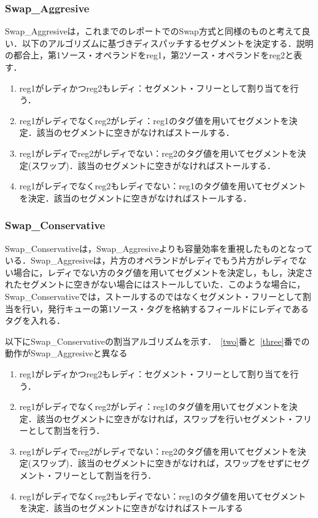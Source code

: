 \documentclass[twocolumn]{jsarticle}
\begin{document}
  \subsubsection{Swap\_Aggresive}
  Swap\_Aggresiveは，これまでのレポートでのSwap方式と同様のものと考えて良い．以下のアルゴリズムに基づきディスパッチするセグメントを決定する．説明の都合上，第1ソース・オペランドをreg1，第2ソース・オペランドをreg2と表す．
  \begin{enumerate}
    \item reg1がレディかつreg2もレディ：セグメント・フリーとして割り当てを行う．
    \label{one}
    \item reg1がレディでなくreg2がレディ：reg1のタグ値を用いてセグメントを決定．該当のセグメントに空きがなければストールする．
    \label{two}
    \item reg1がレディでreg2がレディでない：reg2のタグ値を用いてセグメントを決定(スワップ)．該当のセグメントに空きがなければストールする．
    \label{three}
    \item reg1がレディでなくreg2もレディでない：reg1のタグ値を用いてセグメントを決定．該当のセグメントに空きがなければストールする．
    \label{four}
  \end{enumerate}

  \subsubsection{Swap\_Conservative}
  Swap\_Conservativeは，Swap\_Aggresiveよりも容量効率を重視したものとなっている．Swap\_Aggresiveは，片方のオペランドがレディでもう片方がレディでない場合に，レディでない方のタグ値を用いてセグメントを決定し，もし，決定されたセグメントに空きがない場合にはストールしていた．このような場合に，Swap\_Conservativeでは，ストールするのではなくセグメント・フリーとして割当を行い，発行キューの第1ソース・タグを格納するフィールドにレディであるタグを入れる．
  
  以下にSwap\_Conservativeの割当アルゴリズムを示す．~\ref{two}番と~\ref{three}番での動作がSwap\_Aggresiveと異なる
  \begin{enumerate}
    \item reg1がレディかつreg2もレディ：セグメント・フリーとして割り当てを行う．\item reg1がレディでなくreg2がレディ：reg1のタグ値を用いてセグメントを決定．該当のセグメントに空きがなければ，スワップを行いセグメント・フリーとして割当を行う．
    \item reg1がレディでreg2がレディでない：reg2のタグ値を用いてセグメントを決定(スワップ)．該当のセグメントに空きがなければ，スワップをせずにセグメント・フリーとして割当を行う．
    \item reg1がレディでなくreg2もレディでない：reg1のタグ値を用いてセグメントを決定．該当のセグメントに空きがなければストールする
  \end{enumerate}
\end{document}
